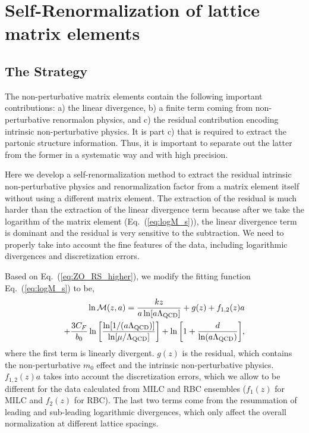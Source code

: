 \section{Self-Renormalization of lattice matrix elements}\label{sec:StrtoRe}
\subsection{The Strategy}\label{Strategy}



The non-perturbative matrix elements contain the following important contributions: a) the linear divergence, b) a finite term coming from non-perturbative renormalon physics, and c) the residual contribution encoding intrinsic non-perturbative physics. It is part c) that is required to extract the partonic structure information. Thus, it is important to separate out the latter from the former in a systematic way and with high precision. 

Here we develop a self-renormalization method to extract the residual intrinsic non-perturbative physics and renormalization factor from a matrix element itself without using a different matrix element. The extraction of the residual is much harder than the extraction of the linear divergence term because after we take the logarithm of the matrix element (Eq.~(\ref{eq:logM_s})), the linear divergence term is dominant and the residual is very sensitive to the subtraction. We need to properly take into account the fine features of the data, including logarithmic divergences and discretization errors. 

Based on Eq.~(\ref{eq:ZO_RS_higher}), we modify the fitting function Eq.~(\ref{eq:logM_s}) to be, 
\begin{align}\label{eq:logM}
\ln \mathcal{M}(z,a) = \frac{k z}{a \ln[a \Lambda_{\rm QCD}]} 
+ g(z) + f_{1,2}(z)a \nonumber\\
+ \frac{3 C_{F}}{b_0} \ln \bigg[\frac{\ln [1 /(a \Lambda_{\rm QCD})]}{\ln [\mu / \Lambda_{\rm QCD}]}\bigg]+\ln \bigg[1+\frac{d}{\ln (a \Lambda_{\rm QCD})}\bigg],
\end{align}
where the first term is linearly divergent. $g(z)$ is the residual, which contains the non-perturbative $m_{0}$ effect and the intrinsic non-perturbative physics. $f_{1,2}(z)a$ takes into account the discretization errors, which we allow to be different for the data calculated from MILC and RBC ensembles ($f_{1}(z)$ for MILC and $f_{2}(z)$ for RBC). The last two terms come from the resummation of leading and sub-leading logarithmic divergences, which only affect the overall normalization at different lattice spacings.

